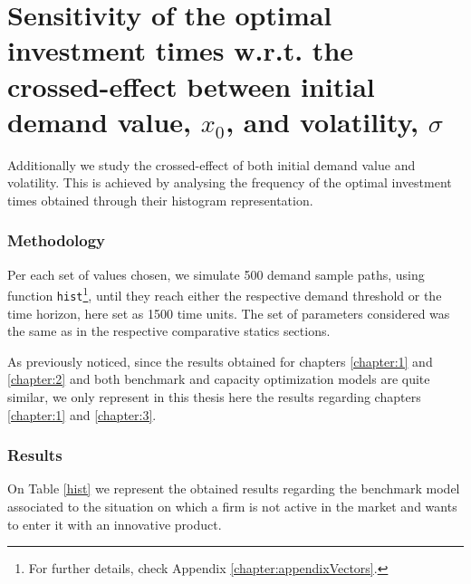 \section{Sensitivity of the optimal investment times w.r.t. the crossed-effect between initial demand value, $x_0$, and volatility, $\sigma$}

Additionally we study the crossed-effect of both initial demand value and volatility. This is achieved by analysing the frequency of the optimal investment times obtained through their histogram representation.

\subsubsection{Methodology}

Per each set of values chosen, we simulate 500 demand sample paths, using function \texttt{hist}\footnote{For further details, check Appendix \ref{chapter:appendixVectors}.}, until they reach either the respective demand threshold or the time horizon, here set as 1500 time units.
The set of parameters considered was the same as in the respective comparative statics sections.

As previously noticed, since the results obtained for chapters \ref{chapter:1} and \ref{chapter:2} and both benchmark and capacity optimization models are quite similar, we only represent in this thesis here the results regarding chapters \ref{chapter:1} and \ref{chapter:3}.


\subsubsection{Results}

On Table \ref{hist} we represent the obtained results regarding the benchmark model associated to the situation on which a firm is not active in the market and wants to enter it with an innovative product. 

